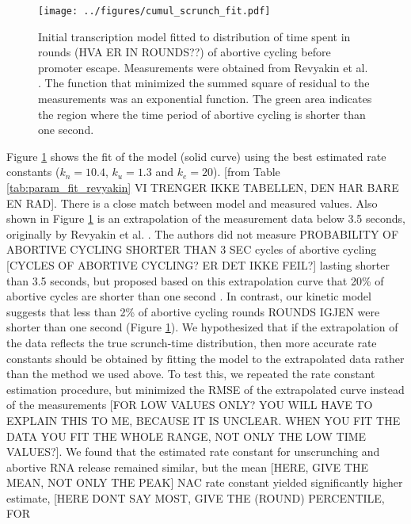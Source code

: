 \begin{figure}
    \begin{center}
      \texttt{[image: ../figures/cumul\_scrunch\_fit.pdf]}
    \end{center}
    \caption{Initial transcription model fitted to distribution of time spent
        in rounds (HVA ER IN ROUNDS??) of abortive cycling before promoter
        escape. Measurements were obtained from Revyakin et al.
        \cite{revyakin_abortive_2006}. The function that minimized the summed
        square of residual to the measurements was an exponential function.
        The green area indicates the region where the time period of abortive
    cycling is shorter than one second.} \label{fig:revyakin_fit}
\end{figure}

Figure \ref{fig:revyakin_fit} shows the fit of the model (solid curve) using
the best estimated rate constants ($k_n=10.4$, $k_u=1.3$ and $k_e=20$).
[from Table \ref{tab:param_fit_revyakin} VI TRENGER IKKE TABELLEN, DEN HAR
BARE EN RAD]. There is a close match between model and measured values. Also
shown in Figure \ref{fig:revyakin_fit} is an extrapolation of the measurement
data below 3.5 seconds, originally by Revyakin et al.
\cite{revyakin_abortive_2006}. The authors did not measure PROBABILITY OF
ABORTIVE CYCLING SHORTER THAN 3 SEC cycles of abortive cycling [CYCLES OF
ABORTIVE CYCLING? ER DET IKKE FEIL?] lasting shorter than 3.5 seconds, but
proposed based on this extrapolation curve that 20\% of abortive cycles are
shorter than one second \cite{revyakin_abortive_2006}.  In contrast, our
kinetic model suggests that less than 2\% of abortive cycling rounds ROUNDS
IGJEN were shorter than one second (Figure \ref{fig:revyakin_fit}). We
hypothesized that if the extrapolation of the data reflects the true
scrunch-time distribution, then more accurate rate constants should be
obtained by fitting the model to the extrapolated data rather than the method
we used above. To test this, we repeated the rate constant estimation
procedure, but minimized the RMSE of the extrapolated curve instead of the
measurements [FOR LOW VALUES ONLY? YOU WILL HAVE TO EXPLAIN THIS TO ME,
BECAUSE IT IS UNCLEAR. WHEN YOU FIT THE DATA YOU FIT THE WHOLE RANGE, NOT ONLY
THE LOW TIME VALUES?]. We found that the estimated rate constant for
unscrunching and abortive RNA release remained similar, but the mean [HERE,
GIVE THE MEAN, NOT ONLY THE PEAK] NAC rate constant yielded significantly
higher estimate, [HERE DONT SAY MOST, GIVE THE (ROUND) PERCENTILE, FOR
